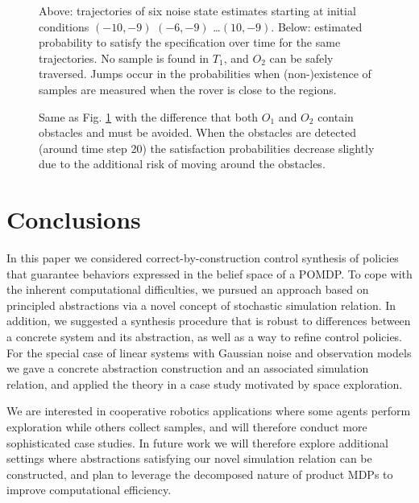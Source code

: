 \documentclass{ifacconf}
\begin{document}
\begin{figure}
  \footnotesize
  \setlength\figurewidth{\columnwidth} 
  \setlength{} 

  
  \setlength{} 

  
  \caption{Above: trajectories of six noise state estimates starting at initial conditions $(-10, -9)$ $(-6, -9)$ \ldots $(10,-9)$. Below: estimated probability to satisfy the specification over time for the same trajectories. No sample is found in $T_1$, and $O_2$ can be safely traversed. Jumps occur in the probabilities when (non-)existence of samples are measured when the rover is close to the regions.}
  \label{fig:exp1}
\end{figure}

\begin{figure}
  \footnotesize
  \setlength\figurewidth{\columnwidth} 
  \setlength{} 

  

  \setlength{} 

  
  \caption{Same as Fig. \ref{fig:exp1} with the difference that both $O_1$ and $O_2$ contain obstacles and must be avoided. When the obstacles are detected (around time step 20) the satisfaction probabilities decrease slightly due to the additional risk of moving around the obstacles.}
  \label{fig:exp2}
\end{figure}


\section{Conclusions}
\label{sec:conclusions}

In this paper we considered correct-by-construction control synthesis of policies that guarantee behaviors expressed in the belief space of a POMDP. To cope with the inherent computational difficulties, we pursued an approach based on principled abstractions via a novel concept of stochastic simulation relation. In addition, we suggested a synthesis procedure that is robust to differences between a concrete system and its abstraction, as well as a way to refine control policies. For the special case of linear systems with Gaussian noise and observation models we gave a concrete abstraction construction and an associated simulation relation, and applied the theory in a case study motivated by space exploration.

We are interested in cooperative robotics applications where some agents perform exploration while others collect samples, and will therefore conduct more sophisticated case studies. In future work we will therefore explore additional settings where abstractions satisfying our novel simulation relation can be constructed, and plan to leverage the decomposed nature of product MDPs to improve computational efficiency.


\end{document}
